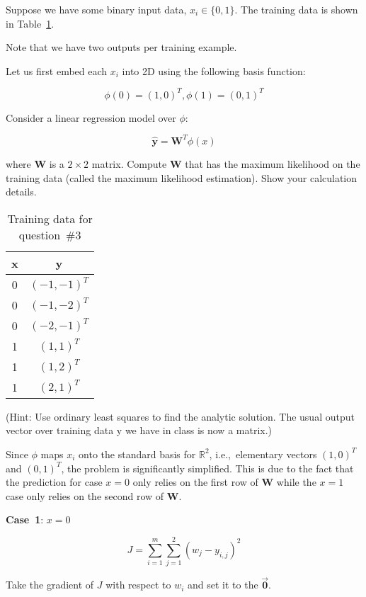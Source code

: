 \begin{problem}
  Suppose we have some binary input data, ${x_i \in \{0, 1\}}$. The training data is shown in Table~\ref{tab:P03:TrainingData}.


\noindent
Note that we have two outputs per training example.

Let us first embed each $x_i$ into 2D using the following basis function:

\[\phi(0) = (1, 0)^{T}, \phi(1) = (0, 1)^{T} \]

Consider a linear regression model over $\phi$:

\[\hat{\mathbf{y}} = \mathbf{W}^{T} \phi(x) \]

\noindent
where $\mathbf{W}$ is a $2\times2$ matrix. Compute $\mathbf{W}$ that has the maximum likelihood on the training data (called the maximum likelihood estimation). Show your calculation details.

\begin{table}[h]
  \centering
  \caption{Training data for question~\#3}\label{tab:P03:TrainingData}
  \begin{tabular}{c|c}
    x & y \\\hline
    0 & $(-1, -1)^{T}$\\
    0 & $(-1, -2)^{T}$\\
    0 & $(-2, -1)^{T}$\\
    1 & $(1, 1)^{T}$\\
    1 & $(1, 2)^{T}$\\
    1 & $(2, 1)^{T}$\\
  \end{tabular}
\end{table}

(Hint: \textnormal{Use ordinary least squares to find the analytic solution. The usual output vector over training data y we have in class is now a matrix.})
\end{problem}

Since $\phi$ maps $x_i$ onto the standard basis for $\mathbb{R}^2$, i.e.,~elementary vectors ${(1,0)}^{T}$ and ${(0,1)}^{T}$, the problem is significantly simplified.  This is due to the fact that the prediction for case $x=0$ only relies on the first row of $\mathbf{W}$ while the $x=1$ case only relies on the second row of $\mathbf{W}$.

\noindent
\textbf{Case~1}: $x=0$

\[ J = \sum_{i=1}^{m} \sum_{j=1}^{2} \left(w_{j} - y_{i,j}\right)^2 \]

\noindent
Take the gradient of $J$ with respect to $w_{i}$ and set it to the $\vec{\mathbf{0}}$.

